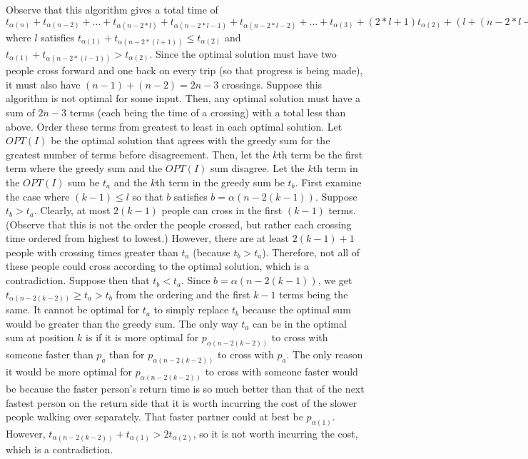 \documentclass{article}
\begin{document}
\begin{enumerate}
\newline Observe that this algorithm gives a total time of $t_{\alpha (n)}+t_{\alpha (n-2)}+\ldots +t_{\alpha (n-2*l)}+t_{\alpha (n-2*l-1)}+t_{\alpha (n-2*l-2)}+\ldots +t_{\alpha (3)}+(2*l+1)t_{\alpha (2)}+(l+(n-2*l-2))t_{\alpha (1)} = t_{\alpha (n)}+t_{\alpha (n-2)}+\ldots +t_{\alpha (n-2*l)}+t_{\alpha (n-2*l-1)}+t_{\alpha (n-2*l-2)}+\ldots +t_{\alpha (3)}+(2*l+1)t_{\alpha (2)}+(n-l-2)t_{\alpha (1)}$ where $l$ satisfies $t_{\alpha (1)} + t_{\alpha (n-2*(l+1))}\le t_{\alpha (2)}$ and $t_{\alpha (1)} + t_{\alpha (n-2*(l-1))}>t_{\alpha (2)}$. Since the optimal solution must have two people cross forward and one back on every trip (so that progress is being made), it must also have $(n-1)+(n-2)=2n-3$ crossings. Suppose this algorithm is not optimal for some input. Then, any optimal solution must have a sum of $2n-3$ terms (each being the time of a crossing) with a total less than above. Order these terms from greatest to least in each optimal solution. Let $OPT(I)$ be the optimal solution that agrees with the greedy sum for the greatest number of terms before disagreement. Then, let the $k$th term be the first term where the greedy sum and the $OPT(I)$ sum disagree. Let the $k$th term in the $OPT(I)$ sum be $t_a$ and the $k$th term in the greedy sum be $t_b$.  First examine the case where $(k-1)\le l$ so that $b$ satisfies $b=\alpha (n-2(k-1))$. Suppose $t_b>t_a$. Clearly, at most $2(k-1)$ people can cross in the first $(k-1)$ terms. (Observe that this is not the order the people crossed, but rather each crossing time ordered from highest to lowest.) However, there are at least $2(k-1)+1$ people with crossing times greater than $t_a$ (because $t_b>t_a$). Therefore, not all of these people could cross according to the optimal solution, which is a contradiction. Suppose then that $t_b<t_a$. Since $b=\alpha (n-2(k-1))$, we get $t_{\alpha(n-2(k-2))}\ge t_a > t_b$ from the ordering and the first $k-1$ terms being the same. It cannot be optimal for $t_a$ to simply replace $t_b$ because the optimal sum would be greater than the greedy sum. The only way $t_a$ can be in the optimal sum at position $k$ is if it is more optimal for $p_{\alpha(n-2(k-2))}$ to cross with someone faster than $p_a$ than for $p_{\alpha(n-2(k-2))}$ to cross with $p_a$. The only reason it would be more optimal for $p_{\alpha(n-2(k-2))}$ to cross with someone faster would be because the faster person's return time is so much better than that of the next fastest person on the return side that it is worth incurring the cost of the slower people walking over separately. That faster partner could at best be $p_{\alpha (1)}$. However, $t_{\alpha(n-2(k-2))}+t_{\alpha (1)}>2t_{\alpha (2)}$, so it is not worth incurring the cost, which is a contradiction.

\end{enumerate}
\end{document}
